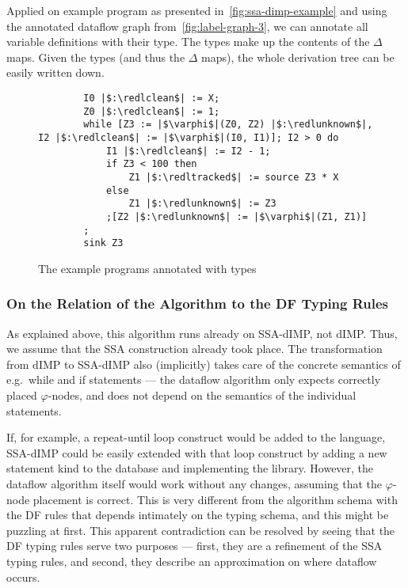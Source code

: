 Applied on example program as presented in~\autoref{fig:ssa-dimp-example} 
and using the annotated dataflow graph from~\autoref{fig:label-graph-3}, we 
can annotate all variable definitions with their type.
The types make up the contents of the $\Delta$ maps.
Given the types (and thus the $\Delta$ maps), the whole derivation tree can be easily written down.

\newcommand{\redltracked}{{\color{red}\ltracked}}
\newcommand{\redlclean}{{\color{red}\lclean}}
\newcommand{\redlunknown}{{\color{red}\lunknown}}

\begin{figure}[h]
    \begin{verbatim}
        I0 |$:\redlclean$| := X;
        Z0 |$:\redlclean$| := 1;
        while [Z3 := |$\varphi$|(Z0, Z2) |$:\redlunknown$|, I2 |$:\redlclean$| := |$\varphi$|(I0, I1)]; I2 > 0 do
            I1 |$:\redlclean$| := I2 - 1;
            if Z3 < 100 then
                Z1 |$:\redltracked$| := source Z3 * X
            else
                Z1 |$:\redlunknown$| := Z3
            ;[Z2 |$:\redlunknown$| := |$\varphi$|(Z1, Z1)]
        ;
        sink Z3
    \end{verbatim}    
    \caption{The example programs annotated with types}
    \label{fig:delta-maps-example}
\end{figure}

\subsubsection*{On the Relation of the Algorithm to the DF Typing Rules}
As explained above, this algorithm runs already on SSA-dIMP, not dIMP.
Thus, we assume that the SSA construction already took place.
The transformation from dIMP to SSA-dIMP also (implicitly) takes care of the
concrete semantics of e.g.\ while and if statements --- the dataflow algorithm
only expects correctly placed $\varphi$-nodes,
and does not depend on the semantics of the individual statements.

If, for example, a repeat-until loop construct would be added to the language,
SSA-dIMP could be easily extended with that loop construct by adding a new statement 
kind to the database and implementing the library.
However, the dataflow algorithm itself would work without any changes, assuming that
the $\varphi$-node placement is correct.
This is very different from the algorithm schema with the DF rules that depends intimately on the 
typing schema, and this might be puzzling at first.
This apparent contradiction can be resolved by seeing that the DF typing 
rules serve two purposes --- first, they are a refinement of the SSA typing rules,
and second, they describe an approximation on where dataflow occurs.

